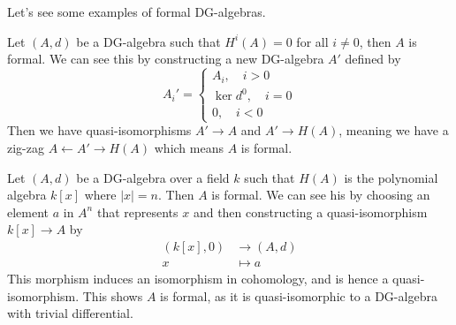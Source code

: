 Let's see some examples of formal DG-algebras. 

\begin{example}
Let $(A, d)$ be a DG-algebra such that $H^i(A) = 0$ for all $i\neq 0$, then $A$ is formal. We can see this by constructing a new DG-algebra $A'$ defined by
\begin{equation*}
A_i'=
\begin{cases}
    A_i, \quad i > 0 \\
    \ker d^0, \quad i=0 \\
    0, \quad i < 0
\end{cases}    
\end{equation*}
Then we have quasi-isomorphisms $A'\longrightarrow A$ and $A'\longrightarrow H(A)$, meaning we have a zig-zag $A\longleftarrow A' \longrightarrow H(A)$ which means $A$ is formal. 
\end{example}

\begin{example}
Let $(A, d)$ be a DG-algebra over a field $k$ such that $H(A)$ is the polynomial algebra $k[x]$ where $|x|=n$. Then $A$ is formal. We can see his by choosing an element $a$ in $A^n$ that represents $x$ and then constructing a quasi-isomorphism $k[x]\longrightarrow A$ by
\begin{align*}
    (k[x], 0)&\longrightarrow (A,d) \\
    x &\longmapsto a
\end{align*} 
This morphism induces an isomorphism in cohomology, and is hence a quasi-isomorphism. This shows $A$ is formal, as it is quasi-isomorphic to a DG-algebra with trivial differential. 
\end{example}














